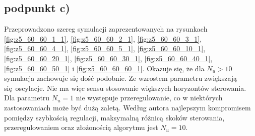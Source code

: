 \documentclass[a4paper, 10pt]{article}
\begin{document}
	\subsection{podpunkt c)}
	Przeprowadzono szereg symulacji zaprezentowanych na rysunkach \ref{fig:z5_60_60_1_1}, \ref{fig:z5_60_60_2_1}, \ref{fig:z5_60_60_3_1}, \ref{fig:z5_60_60_4_1}, \ref{fig:z5_60_60_5_1}, \ref{fig:z5_60_60_10_1}, \ref{fig:z5_60_60_20_1}, \ref{fig:z5_60_60_30_1}, \ref{fig:z5_60_60_40_1}, \ref{fig:z5_60_60_50_1} i 
	\ref{fig:z5_60_60_60_1}. Okazuje się, że dla $N_u > 10 $ symulacja zachowuje się dość podobnie. Ze wzrostem parametru zwiększają się oscylacje. Nie ma więc sensu stosowanie większych horyzontów sterowania. Dla parametru $N_u = 1$ nie występuje przeregulowanie, co w niektórych zastosowaniach może być dużą zaletą.
	Według autora najlepszym kompromisem pomiędzy szybkością regulacji, maksymalną różnicą skoków sterowania, przeregulowaniem oraz złożonością algorytmu jest $N_u = 10$.
\end{document}
